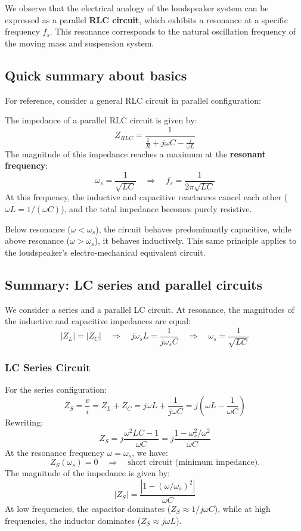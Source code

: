 We observe that the electrical analogy of the loudspeaker system can be expressed as a parallel \textbf{RLC circuit}, which exhibits a resonance at a specific frequency \( f_s \).  
This resonance corresponds to the natural oscillation frequency of the moving mass and suspension system.

\subsection{Quick summary about basics}

For reference, consider a general RLC circuit in parallel configuration:

The impedance of a parallel RLC circuit is given by:
\[
Z_{RLC} = \frac{1}{\frac{1}{R} + j\omega C - \frac{j}{\omega L}}
\]
The magnitude of this impedance reaches a maximum at the \textbf{resonant frequency}:
\[
\omega_s = \frac{1}{\sqrt{L C}} \quad \Rightarrow \quad f_s = \frac{1}{2\pi\sqrt{L C}}
\]
At this frequency, the inductive and capacitive reactances cancel each other (\( \omega L = 1 / (\omega C) \)), and the total impedance becomes purely resistive.

Below resonance (\( \omega < \omega_s \)), the circuit behaves predominantly capacitive, while above resonance (\( \omega > \omega_s \)), it behaves inductively.  
This same principle applies to the loudspeaker’s electro-mechanical equivalent circuit.

\subsection{Summary: LC series and parallel circuits}

We consider a series and a parallel LC circuit.  
At resonance, the magnitudes of the inductive and capacitive impedances are equal:
\[
|Z_L| = |Z_C| \quad \Rightarrow \quad j \omega_s L = \frac{1}{j \omega_s C} \quad \Rightarrow \quad \omega_s = \frac{1}{\sqrt{L C}}
\]

\subsubsection{LC Series Circuit}

For the series configuration:
\[
Z_S = \frac{v}{i} = Z_L + Z_C = j \omega L + \frac{1}{j \omega C} = j \left( \omega L - \frac{1}{\omega C} \right)
\]
Rewriting:
\[
Z_S = j \frac{\omega^2 L C - 1}{\omega C} = j \frac{1 - \omega_s^2 / \omega^2}{\omega C}
\]
At the resonance frequency \( \omega = \omega_s \), we have:
\[
Z_S(\omega_s) = 0 \quad \Rightarrow \quad \text{short circuit (minimum impedance).}
\]
The magnitude of the impedance is given by:
\[
|Z_S| = \frac{|1 - (\omega / \omega_s)^2|}{\omega C}
\]
At low frequencies, the capacitor dominates (\(Z_S \approx 1 / j\omega C\)), while at high frequencies, the inductor dominates (\(Z_S \approx j\omega L\)).

